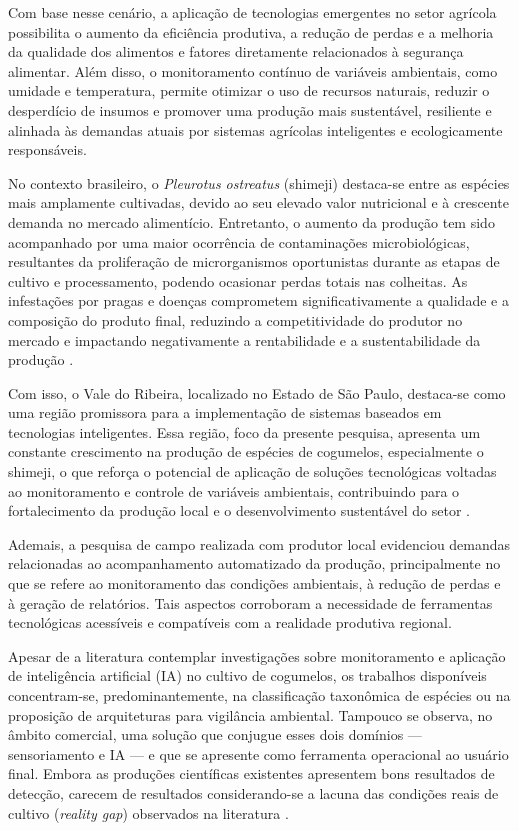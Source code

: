 \documentclass[11pt,a4paper]{article}
\begin{document}
Com base nesse cenário, a aplicação de tecnologias emergentes no setor agrícola possibilita o aumento da eficiência produtiva, a redução de perdas e a melhoria da qualidade dos alimentos e fatores diretamente relacionados à segurança alimentar. Além disso, o monitoramento contínuo de variáveis ambientais, como umidade e temperatura, permite otimizar o uso de recursos naturais, reduzir o desperdício de insumos e promover uma produção mais sustentável, resiliente e alinhada às demandas atuais por sistemas agrícolas inteligentes e ecologicamente responsáveis.

No contexto brasileiro, o \textit{Pleurotus ostreatus} (shimeji) destaca-se entre as espécies mais amplamente cultivadas, devido ao seu elevado valor nutricional e à crescente demanda no mercado alimentício. Entretanto, o aumento da produção tem sido acompanhado por uma maior ocorrência de contaminações microbiológicas, resultantes da proliferação de microrganismos oportunistas durante as etapas de cultivo e processamento, podendo ocasionar perdas totais nas colheitas. As infestações por pragas e doenças comprometem significativamente a qualidade e a composição do produto final, reduzindo a competitividade do produtor no mercado e impactando negativamente a rentabilidade e a sustentabilidade da produção \cite{Scheffer2023}.

Com isso, o Vale do Ribeira, localizado no Estado de São Paulo, destaca-se como uma região promissora para a implementação de sistemas baseados em tecnologias inteligentes. Essa região, foco da presente pesquisa, apresenta um constante crescimento na produção de espécies de cogumelos, especialmente o shimeji, o que reforça o potencial de aplicação de soluções tecnológicas voltadas ao monitoramento e controle de variáveis ambientais, contribuindo para o fortalecimento da produção local e o desenvolvimento sustentável do setor \cite{Urben2017}.

Ademais, a pesquisa de campo realizada com produtor local evidenciou demandas relacionadas ao acompanhamento automatizado da produção, principalmente no que se refere ao monitoramento das condições ambientais, à redução de perdas e à geração de relatórios. Tais aspectos corroboram a necessidade de ferramentas tecnológicas acessíveis e compatíveis com a realidade produtiva regional.

Apesar de a literatura contemplar investigações sobre monitoramento e aplicação de inteligência artificial (IA) no cultivo de cogumelos, os trabalhos disponíveis concentram-se, predominantemente, na classificação taxonômica de espécies ou na proposição de arquiteturas para vigilância ambiental. Tampouco se observa, no âmbito comercial, uma solução que conjugue esses dois domínios --- sensoriamento e IA --- e que se apresente como ferramenta operacional ao usuário final. Embora as produções científicas existentes apresentem bons resultados de detecção, carecem de resultados considerando-se a lacuna das condições reais de cultivo (\textit{reality gap}) observados na literatura \cite{Bennin2026}.
\end{document}
